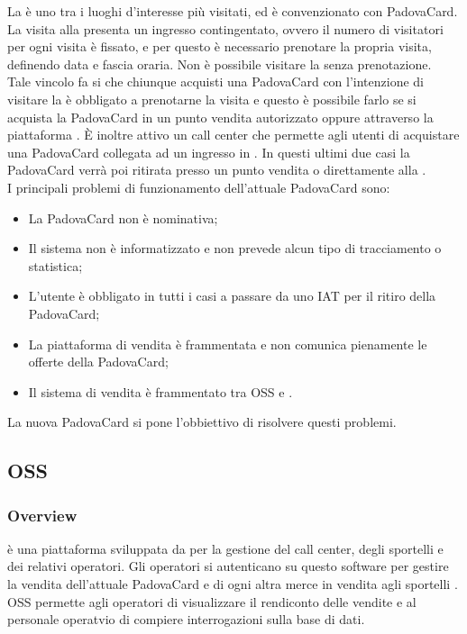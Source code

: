 \label{cappella}
La \cappella è uno tra i luoghi d'interesse più visitati, ed è convenzionato con PadovaCard. La visita alla \cappella presenta un ingresso contingentato, ovvero il numero di visitatori per ogni visita è fissato, e per questo è necessario prenotare la propria visita, definendo data e fascia oraria. Non è possibile visitare la \cappella senza prenotazione. \\

Tale vincolo fa si che chiunque acquisti una PadovaCard con l'intenzione di visitare la \cappella è obbligato a prenotarne la visita e questo è possibile farlo se si acquista la PadovaCard in un punto vendita autorizzato oppure attraverso la piattaforma \glossario{\vivaticket}.
\`E inoltre attivo un call center che permette agli utenti di acquistare una PadovaCard collegata ad un ingresso in \cappella.
In questi ultimi due casi la PadovaCard verrà poi ritirata presso un punto vendita o direttamente alla \cappella.\\

I principali problemi di funzionamento dell'attuale PadovaCard sono:
\begin{itemize}
\item La PadovaCard non è nominativa;
\item Il sistema non è informatizzato e non prevede alcun tipo di tracciamento o statistica;
\item L'utente è obbligato in tutti i casi a passare da uno IAT per il ritiro della PadovaCard;
\item La piattaforma di vendita è frammentata e non comunica pienamente le offerte della PadovaCard;
\item Il sistema di vendita è frammentato tra OSS e \tlite.
\end{itemize}

La nuova PadovaCard si pone l'obbiettivo di risolvere questi problemi.



\subsection{OSS}\label{oss}
\subsubsection{Overview}
 è una piattaforma sviluppata da \net per la gestione del call center, degli sportelli  e dei relativi operatori.
Gli operatori si autenticano su questo software per gestire la vendita dell'attuale PadovaCard e di ogni altra merce in vendita agli sportelli . 
OSS permette agli operatori di visualizzare il rendiconto delle vendite e al personale operatvio di compiere interrogazioni sulla base di dati.

